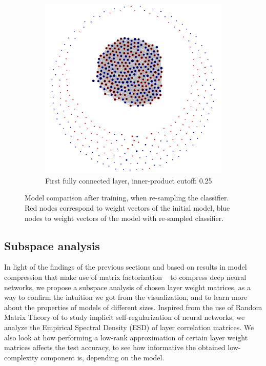 \begin{figure}[H]
\begin{subfigure}[b]{0.62\textwidth}
   \includegraphics[width=\linewidth]{images/fc1-sgd-resampled.png}
   \caption{First fully connected layer, inner-product cutoff: 0.25}
   \label{fig:fc1-sgd-resampled}
\end{subfigure}
\caption{Model comparison after training, when re-sampling the classifier. Red nodes correspond to weight vectors of the initial model, blue nodes to weight vectors of the model with re-sampled classifier.}
\end{figure}

\subsection{Subspace analysis}

In light of the findings of the previous sections and based on results in model compression that make use of matrix factorization ~\autocite{lebedev2014speeding} to compress deep neural networks, we propose a subspace analysis of chosen layer weight matrices, as a way to confirm the intuition we got from the visualization, and to learn more about the properties of models of different sizes. Inspired from the use of Random Matrix Theory of \cite{martin2018implicit} to study implicit self-regularization of neural networks, we analyze the Empirical Spectral Density (ESD) of layer correlation matrices. We also look at how performing a low-rank approximation of certain layer weight matrices affects the test accuracy, to see how informative the obtained low-complexity component is, depending on the model.

